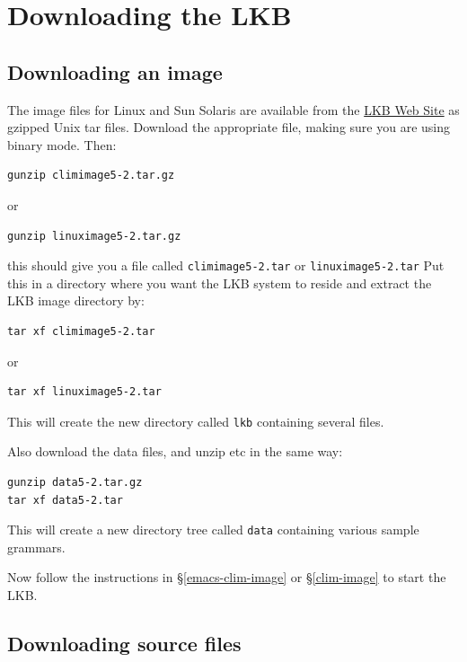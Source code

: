 \documentclass[12pt]{report}
\newcommand{\filename}[1]{{\tt #1}}
\begin{document}
\section{Downloading the LKB}
\label{down}

\subsection{Downloading an image}
\label{down-images}

The image files for Linux and Sun Solaris are available from the
\href{http://www-csli.stanford.edu/~aac/lkb.html}{LKB Web Site}
as gzipped Unix tar files.
Download the appropriate file, making sure you are using binary mode.
Then:
\begin{verbatim}
gunzip climimage5-2.tar.gz
\end{verbatim}
or
\begin{verbatim}
gunzip linuximage5-2.tar.gz
\end{verbatim}
this should give you a file called \filename{climimage5-2.tar} or
\filename{linuximage5-2.tar}
Put this in a directory where you want the LKB system to reside
and extract the LKB image directory by:
\begin{verbatim}
tar xf climimage5-2.tar
\end{verbatim}
or
\begin{verbatim}
tar xf linuximage5-2.tar
\end{verbatim}
This will create the new directory called \filename{lkb} containing
several files. 

Also download the data files, and unzip etc in the same way:
\begin{verbatim}
gunzip data5-2.tar.gz
tar xf data5-2.tar
\end{verbatim}
This will create a new directory tree called \filename{data} containing
various sample grammars.

Now follow the instructions in \S\ref{emacs-clim-image}
or \S\ref{clim-image}
to start the LKB.


\subsection{Downloading source files}
\label{down-src}
\end{document}
